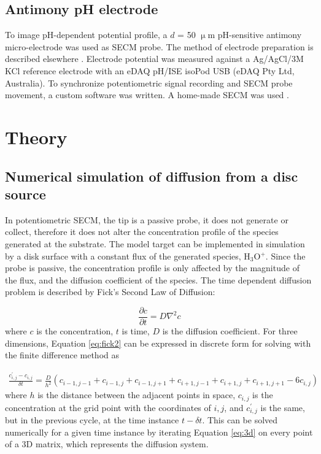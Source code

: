 \documentclass[3p]{elsarticle}
\begin{document}
\subsection{Antimony pH electrode}
To image pH-dependent potential profile, a $d$ = 50 $\upmu$m pH-sensitive antimony micro-electrode was used as SECM probe. The method of electrode preparation is described elsewhere \cite{antimony}. Electrode potential was measured against a Ag/AgCl/3M KCl reference electrode with an eDAQ pH/ISE isoPod USB (eDAQ Pty Ltd, Australia). To synchronize potentiometric signal recording and SECM probe movement, a custom software was written. A home-made SECM was used \cite{homemadeSECM}.


\section{Theory}

\subsection{Numerical simulation of diffusion from a disc source}

In potentiometric SECM, the tip is a passive probe, it does not generate or collect, therefore it does not alter the concentration profile of the species generated at the substrate. The model target can be implemented in simulation by a disk surface with a constant flux of the generated species, H$_3$O$^{+}$. Since the probe is passive, the concentration profile is only affected by the magnitude of the flux, and the diffusion coefficient of the species. The time dependent diffusion problem is described by Fick's Second Law of Diffusion:

\begin{equation}
\label{eq:fick2}
	\frac
		{\partial c}
		{\partial t}
		=
		D
		\nabla^2c
\end{equation}
where $c$ is the concentration, $t$ is time, $D$ is the diffusion coefficient. For three dimensions, Equation \ref{eq:fick2} can be expressed in discrete form for solving with the finite difference method as

\begin{equation}
\label{eq:3d}
	\begin{split}
	\frac	{c_{i,j}^{'} - c_{i,j}}{\delta t}
	=
	\frac {D} {h^2} (c_{i-1,j-1} + c_{i-1,j} + c_{i-1,j+1} + c_{i+1,j-1} + c_{i+1,j} + c_{i+1,j+1} - 6c_{i,j})
	\end{split}
\end{equation}
where $h$ is the distance between the adjacent points in space, $c_{i,j}$ is the concentration at the grid point with the coordinates of $i, j$, and $c_{i,j}^{'}$ is the same, but in the previous cycle, at the time instance $t-\delta t$. This can be solved numerically for a given time instance by iterating Equation \ref{eq:3d} on every point of a 3D matrix, which represents the diffusion system.
\end{document}
